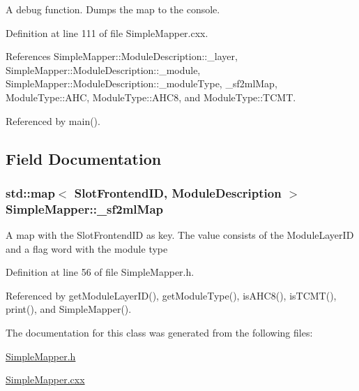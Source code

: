 A debug function. Dumps the map to the console. 

Definition at line 111 of file SimpleMapper.cxx.

References SimpleMapper::ModuleDescription::\_\-layer, SimpleMapper::ModuleDescription::\_\-module, SimpleMapper::ModuleDescription::\_\-moduleType, \_\-sf2mlMap, ModuleType::AHC, ModuleType::AHC8, and ModuleType::TCMT.

Referenced by main().

\subsection{Field Documentation}
\hypertarget{class_simple_mapper_abc72184f9c3735233e2d21ef36161699}{
\subsubsection[{\_\-sf2mlMap}]{\setlength{\rightskip}{0pt plus 5cm}std::map$<$ {\bf SlotFrontendID}, {\bf ModuleDescription} $>$ {\bf SimpleMapper::\_\-sf2mlMap}}}
\label{class_simple_mapper_abc72184f9c3735233e2d21ef36161699}


A map with the SlotFrontendID as key. The value consists of the ModuleLayerID and a flag word with the module type 

Definition at line 56 of file SimpleMapper.h.

Referenced by getModuleLayerID(), getModuleType(), isAHC8(), isTCMT(), print(), and SimpleMapper().

The documentation for this class was generated from the following files:\begin{DoxyCompactItemize}
\item 
\hyperlink{_simple_mapper_8h}{SimpleMapper.h}\item 
\hyperlink{_simple_mapper_8cxx}{SimpleMapper.cxx}\end{DoxyCompactItemize}
